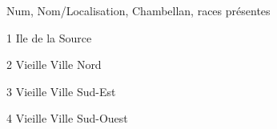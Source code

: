 Num, Nom/Localisation, Chambellan, races présentes

1 Ile de la Source

2 Vieille Ville Nord

3 Vieille Ville Sud-Est

4 Vieille Ville Sud-Ouest
